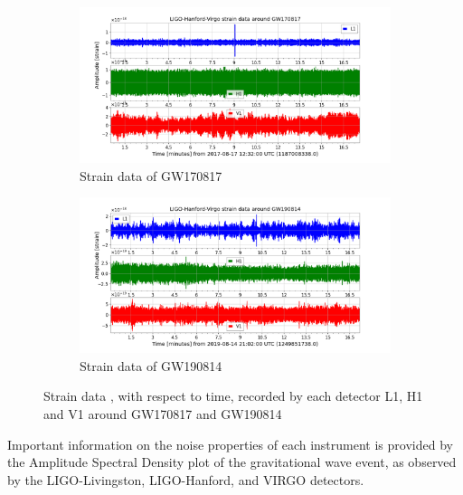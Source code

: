 \begin{figure}[htb]
    \centering
    \begin{subfigure}{0.45\textwidth}
       \centering
    
      \includegraphics[width=1.27\linewidth]{GWanalysisProject_codefile/strainplot/GW170817strain.png}
           \caption{Strain data of GW170817}
           \label{fig: gw170817strain}
    \end{subfigure}
    \begin{subfigure}{0.45\textwidth}
        \centering
        \includegraphics[width=1.27\linewidth]{GWanalysisProject_codefile/strainplot/GW190814strain.png}
        \caption{Strain data of GW190814}
        \label{fig: gw190521strain}
    \end{subfigure}
    \caption{Strain data , with respect to time, recorded by each detector L1, H1 and V1 around GW170817 and GW190814}
    \label{fig: strainplot}
\end{figure}

Important information on the noise properties of each instrument is provided by the Amplitude Spectral Density plot of the gravitational wave event, as observed by the LIGO-Livingston, LIGO-Hanford, and VIRGO detectors. 


